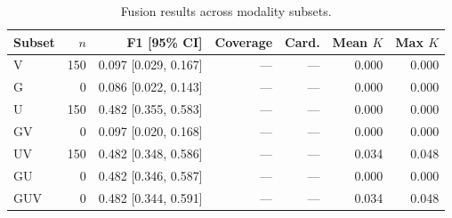 \begin{table}[htbp]
\centering
\caption{Fusion results across modality subsets.}
\label{tab:fusion}
\begin{tabular}{@{}lrrrrrr@{}}
\toprule
Subset & $n$ & F1 [95\% CI] & Coverage & Card. & Mean $K$ & Max $K$ \\
\midrule
V & 150 & 0.097 [0.029, 0.167] & --- & --- & 0.000 & 0.000 \\
G & 0 & 0.086 [0.022, 0.143] & --- & --- & 0.000 & 0.000 \\
U & 150 & 0.482 [0.355, 0.583] & --- & --- & 0.000 & 0.000 \\
GV & 0 & 0.097 [0.020, 0.168] & --- & --- & 0.000 & 0.000 \\
UV & 150 & 0.482 [0.348, 0.586] & --- & --- & 0.034 & 0.048 \\
GU & 0 & 0.482 [0.346, 0.587] & --- & --- & 0.000 & 0.000 \\
GUV & 0 & 0.482 [0.344, 0.591] & --- & --- & 0.034 & 0.048 \\
\bottomrule
\end{tabular}
\end{table}
